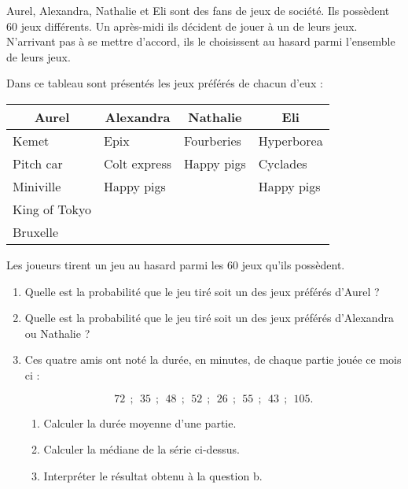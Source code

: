 
\medskip

Aurel, Alexandra, Nathalie et Eli sont des fans de jeux de société. Ils possèdent $60$ jeux différents. Un après-midi ils décident de jouer à un de leurs jeux. N'arrivant pas à se mettre d'accord, ils le choisissent au hasard parmi l'ensemble de leurs jeux.

\medskip

Dans ce tableau sont présentés les jeux préférés de chacun d'eux :

\begin{center}
\begin{tabularx}{\linewidth}{|*{4}{X|}}\hline
\multicolumn{1}{c|}{Aurel}& \multicolumn{1}{c|}{Alexandra}& \multicolumn{1}{c|}{Nathalie}& \multicolumn{1}{c|}{Eli}\\ \hline
Kemet 			&Epix 			&Fourberies &Hyperborea\\ \hline
Pitch car 		&Colt express 	&Happy pigs &Cyclades\\ \hline
Miniville 		&Happy pigs 	&			&Happy pigs\\ \hline
King of Tokyo	&				&			&\\ \hline
Bruxelle		&				&			&\\ \hline
\end{tabularx}
\end{center}

Les joueurs tirent un jeu au hasard parmi les 60 jeux qu'ils possèdent.

\medskip

\begin{enumerate}
\item Quelle est la probabilité que le jeu tiré soit un des jeux préférés d'Aurel ?
\item Quelle est la probabilité que le jeu tiré soit un des jeux préférés d'Alexandra ou Nathalie ?
\item Ces quatre amis ont noté la durée, en minutes, de chaque partie jouée ce mois ci :

\[72~~;~~35~~;~~48~~;~~52~~;~~26~~;~~55~~;~~43~~;~~105.\]
	\begin{enumerate}
		\item Calculer la durée moyenne d'une partie.
		\item Calculer la médiane de la série ci-dessus.
		\item Interpréter le résultat obtenu à la question b.
	\end{enumerate}
\end{enumerate}

\vspace{0,5cm}

